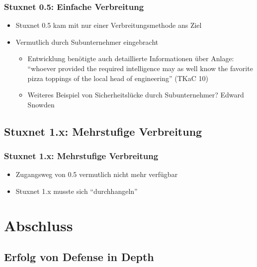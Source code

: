 \documentclass{beamer}
\begin{document}
\begin{frame}
  \frametitle{Stuxnet 0.5: Einfache Verbreitung}
  \begin{itemize}
    \item Stuxnet 0.5 kam mit nur einer Verbreitungsmethode ans Ziel
    \item Vermutlich durch Subunternehmer eingebracht
      \begin{itemize}
        \item Entwicklung benötigte auch detaillierte Informationen über Anlage:
          ``whoever provided the required intelligence may as well know the favorite pizza toppings of the local head of engineering'' (TKaC 10)
      \end{itemize}
      \begin{itemize} %
        \item Weiteres Beispiel von Sicherheitslücke durch Subunternehmer? \pause Edward Snowden
      \end{itemize}
  \end{itemize}
\end{frame}

\subsection{Stuxnet 1.x: Mehrstufige Verbreitung}

\begin{frame}
  \frametitle{Stuxnet 1.x: Mehrstufige Verbreitung}
  \begin{itemize}
    \item Zugangsweg von 0.5 vermutlich nicht mehr verfügbar
    \item Stuxnet 1.x musste sich ``durchhangeln''
  \end{itemize}
\end{frame}

\section{Abschluss}

\subsection{Erfolg von Defense in Depth}
\end{document}
